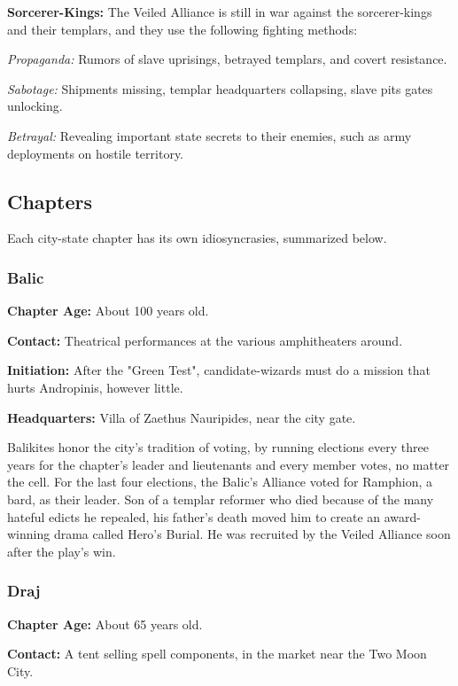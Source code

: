 \textbf{Sorcerer-Kings:} The Veiled Alliance is still in war against the sorcerer-kings and their templars, and they use the following fighting methods:
\begin{enumerate*}
	\item \textit{Propaganda:} Rumors of slave uprisings, betrayed templars, and covert resistance.
	\item \textit{Sabotage:} Shipments missing, templar headquarters collapsing, slave pits gates unlocking.
	\item \textit{Betrayal:} Revealing important state secrets to their enemies, such as army deployments on hostile territory.
\end{enumerate*}



\subsection{Chapters}
Each city-state chapter has its own idiosyncrasies, summarized below.


\subsubsection{Balic}
\textbf{Chapter Age:} About 100 years old.

\textbf{Contact:} Theatrical performances at the various amphitheaters around.

\textbf{Initiation:} After the "Green Test", candidate-wizards must do a mission that hurts Andropinis, however little.

\textbf{Headquarters:} Villa of Zaethus Nauripides, near the city gate.

Balikites honor the city's tradition of voting, by running elections every three years for the chapter's leader and lieutenants and every member votes, no matter the cell. For the last four elections, the Balic's Alliance voted for Ramphion, a bard, as their leader. Son of a templar reformer who died because of the many hateful edicts he repealed, his father's death moved him to create an award-winning drama called Hero's Burial. He was recruited by the Veiled Alliance soon after the play's win.


\subsubsection{Draj}
\textbf{Chapter Age:} About 65 years old.

\textbf{Contact:} A tent selling spell components, in the market near the Two Moon City.

